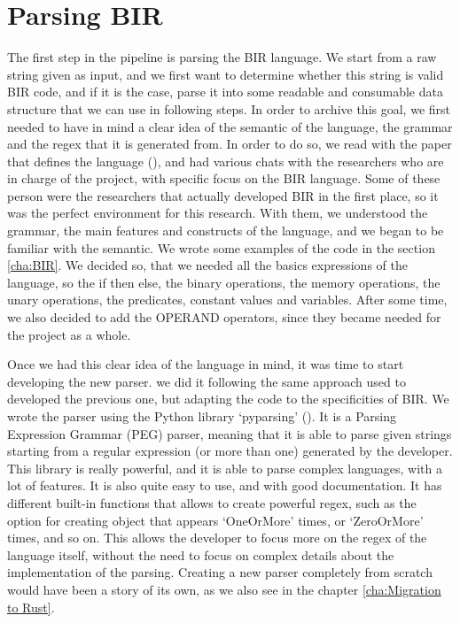 \section{Parsing BIR}
\label{cha:Parsing BIR} The first step in the pipeline is parsing the BIR
language. We start from a raw string given as input, and we first want to
determine whether this string is valid BIR code, and if it is the case, parse it
into some readable and consumable data structure that we can use in following
steps. In order to archive this goal, we first needed to have in mind a clear
idea of the semantic of the language, the grammar and the regex that it is generated
from. In order to do so, we read with the paper that defines the language (\cite{bir_pub}),
and had various chats with the researchers who are in charge of the project, with
specific focus on the BIR language. Some of these person were the researchers
that actually developed BIR in the first place, so it was the perfect environment
for this research. With them, we understood the grammar, the main features and
constructs of the language, and we began to be familiar with the semantic. We
wrote some examples of the code in the section \ref{cha:BIR}. We decided so,
that we needed all the basics expressions of the language, so the if then else,
the binary operations, the memory operations, the unary operations, the predicates,
constant values and variables. After some time, we also decided to add the
OPERAND operators, since they became needed for the project as a whole.

Once we had this clear idea of the language in mind, it was time to start
developing the new parser. we did it following the same approach used to developed
the previous one, but adapting the code to the specificities of BIR. We wrote the
parser using the Python library `pyparsing' (\cite{pyparsing}). It is a Parsing
Expression Grammar (PEG) parser, meaning that it is able to parse given strings starting
from a regular expression (or more than one) generated by the developer. This
library is really powerful, and it is able to parse complex languages, with a
lot of features. It is also quite easy to use, and with good documentation. It has
different built-in functions that allows to create powerful regex, such as the
option for creating object that appears `OneOrMore' times, or `ZeroOrMore' times,
and so on. This allows the developer to focus more on the regex of the language itself,
without the need to focus on complex details about the implementation of the
parsing. Creating a new parser completely from scratch would have been a story of
its own, as we also see in the chapter \ref{cha:Migration to Rust}.

